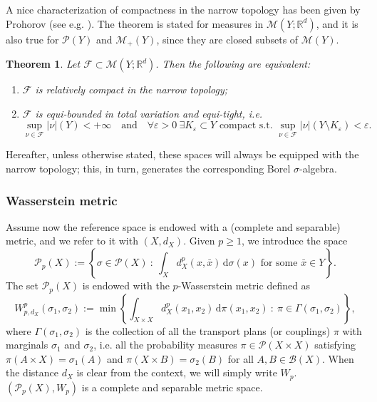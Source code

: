 \documentclass[10pt,leqno]{amsart}
\numberwithin{equation}{section}
\newtheorem{teorema}{Theorem}[section]
\newcommand{\R}{\mathbb{R}}
\newcommand{\PP}{\mathcal{P}}
\renewcommand{\d}{\mathrm{d}}
\begin{document}
A nice characterization of compactness in the narrow topology has been given by Prohorov (see e.g. \cite[Theorem 8.6.2]{Bogachev07}). The theorem is stated for measures in $\mathcal{M}(Y;\R^d)$, and it is also true for $\PP(Y)$ and $\mathcal{M}_+(Y)$, since they are closed subsets of $\mathcal{M}(Y)$.

\begin{teorema}
    Let $\mathcal{F}\subset \mathcal{M}(Y;\R^d)$. Then the following are equivalent:
    \begin{enumerate}
        \item $\mathcal{F}$ is relatively compact in the narrow topology;
        \item $\mathcal{F}$ is equi-bounded in total variation and equi-tight, i.e. 
        \[ \sup_{\nu\in \mathcal{F}} |\nu|(Y) <+\infty\quad \text{and}\quad\forall \varepsilon>0 \ \exists K_{\varepsilon}\subset Y \text{ compact s.t. } \sup_{\nu\in \mathcal{F}}|\nu|(Y\setminus K_\varepsilon) <\varepsilon.\]
    \end{enumerate}
\end{teorema}
Hereafter, unless otherwise stated, these spaces will always be equipped with the narrow topology; 
this, in turn, generates the 
corresponding Borel $\sigma$-algebra.

\subsubsection{Wasserstein metric}\label{OT and Wass}
Assume now the reference space is endowed with a (complete and separable) metric, and we refer to it with $(X,d_X)$. Given 
$p\geq 1$,
we introduce the space 
\[\PP_p(X):= \left\{ \sigma \in \PP(X) \ : \ \int_X d_X^p(x,\bar{x}) \,\d\sigma(x) \text{ for some } \bar{x}\in Y\right\}.\]
The set $\PP_p(X)$ is 
endowed with the $p$-Wasserstein metric defined as
    \[W_{p,d_X}^p(\sigma_1,\sigma_2):=  {\min}  \left\{ 
    \int_{X\times X} d_X^p(x_1,x_2) \,\d\pi(x_1,x_2) \ : \ \pi \in \Gamma(\sigma_1,\sigma_2) \right\}, \]
where $\Gamma(\sigma_1,\sigma_2)$ is the collection of all the transport plans 
(or couplings) $\pi$ 
with marginals $\sigma_1$ and $\sigma_2$, i.e. all the probability measures $\pi \in \PP(X\times X)$ satisfying $\pi(A\times X) = \sigma_1(A)$ and $\pi(X\times B) = \sigma_2(B)$ for all $A,B \in \mathcal{B}(X)$. When the distance $d_X$ is clear from the context, we will simply write $W_p$. $(\PP_p(X),W_p)$ is a complete and separable metric space.
\end{document}
